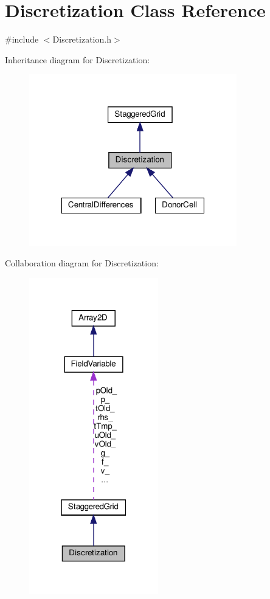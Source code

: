\hypertarget{classDiscretization}{}\section{Discretization Class Reference}
\label{classDiscretization}


{\ttfamily \#include $<$Discretization.\+h$>$}



Inheritance diagram for Discretization\+:
\nopagebreak
\begin{figure}[H]
\begin{center}
\leavevmode
\includegraphics[width=256pt]{classDiscretization__inherit__graph}
\end{center}
\end{figure}


Collaboration diagram for Discretization\+:
\nopagebreak
\begin{figure}[H]
\begin{center}
\leavevmode
\includegraphics[width=159pt]{classDiscretization__coll__graph}
\end{center}
\end{figure}
